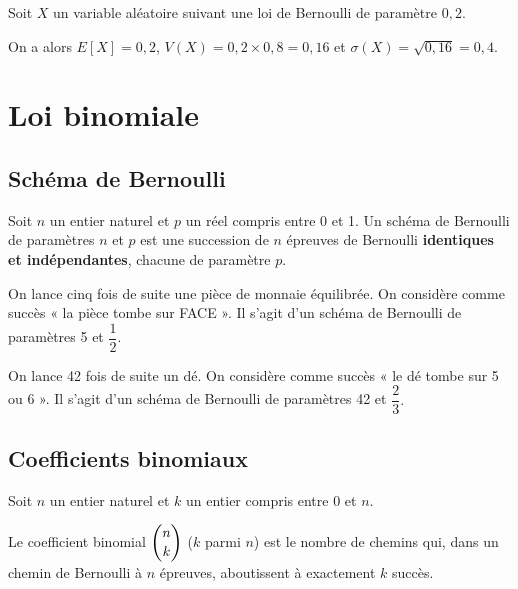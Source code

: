 \documentclass[11pt,fleqn, openany]{book} %
\begin{document}
\begin{example} Soit $X$ un variable aléatoire suivant une loi de Bernoulli de paramètre $0,2$. 

On a alors $E[X]=0,2$, $V(X)=0,2 \times 0,8 = 0,16$ et $\sigma (X)= \sqrt{0,16}=0,4$.\end{example}

\newpage

\section{Loi binomiale}

\subsection{Schéma de Bernoulli}
\begin{definition}Soit $n$ un entier naturel et $p$ un réel compris entre 0 et 1. Un schéma de Bernoulli de paramètres $n$ et $p$ est une succession de $n$ épreuves de Bernoulli \textbf{identiques et indépendantes}, chacune de paramètre $p$.\end{definition}

\begin{example} On lance cinq fois de suite une pièce de monnaie équilibrée. On considère comme succès « la pièce tombe sur FACE ». Il s'agit d'un schéma de Bernoulli de paramètres 5 et $\dfrac{1}{2}$.\end{example}

\begin{example}On lance 42 fois de suite un dé. On considère comme succès « le dé tombe sur 5 ou 6 ». Il s'agit d'un schéma de Bernoulli de paramètres 42 et $\dfrac{2}{3}.$\end{example}

\subsection{Coefficients binomiaux}


\begin{definition}Soit $n$ un entier naturel et $k$ un entier compris entre 0 et $n$. 

Le coefficient binomial $\dbinom{n}{k}$ ($k$ parmi $n$) est le nombre de chemins qui, dans un chemin de Bernoulli à $n$ épreuves, aboutissent à exactement $k$ succès.\end{definition}
\end{document}
